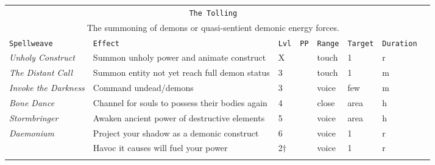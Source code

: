 \documentclass[10pt,a4paper]{article}
\begin{document}
\begin{table}[htbp!]
\begin{tabular}{llllllll}
    \multicolumn{7}{c}{\texttt{The Tolling}}\\
    \multicolumn{7}{c}{The summoning of demons or quasi-sentient demonic energy forces.}\\
    \hline
    \texttt{Spellweave} & \texttt{Effect} & \texttt{Lvl} & \texttt{PP} & \texttt{Range} & \texttt{Target} & \texttt{Duration} \\
    \hline
    \multirow{1}{*}{\textit{Unholy Construct}} & Summon unholy power and animate construct & X && touch & 1 & r \\
    \hline
    \multirow{1}{*}{\textit{The Distant Call}} & Summon entity not yet reach full demon status & 3 && touch & 1 & m \\
    \hline
    \multirow{1}{*}{\textit{Invoke the Darkness}} & Command undead/demons & 3 && voice & few & m \\
    \hline
    \multirow{1}{*}{\textit{Bone Dance}} & Channel for souls to possess their bodies again & 4 && close & area & h \\
    \hline
    \multirow{1}{*}{\textit{Stormbringer}} & Awaken ancient power of destructive elements & 5 && voice & area & h \\
	\hline
    \multirow{1}{*}{\textit{Daemonium}} & Project your shadow as a demonic construct & 6 && voice & 1 & r \\
									   & Havoc it causes will fuel your power & 2$\dagger$ && voice & 1 & r \\
	&&&&&&\\
	

\end{tabular}
\end{table}
\end{document}
